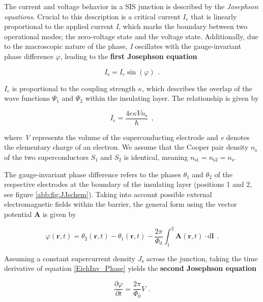 The current and voltage behavior in a SIS junction is described by the \textit{Josephson equations}. Crucial to this description is a critical current \textit{$I_\mathrm{c}$} that is linearly proportional to the applied current \textit{I}, which marks the boundary between two operational modes; the zero-voltage state and the voltage state. Additionally, due to the macroscopic nature of the phase, \textit{I} oscillates with the gauge-invariant phase difference $\varphi$, leading to the \textbf{first Josephson equation} \cite{Josephson1965}

\begin{equation}
\label{1.JE}
I_\mathrm{s} = I_\mathrm{c}\sin(\varphi) \ \ .
\end{equation}

$I_\mathrm{c}$ is proportional to the coupling strength $\kappa$, which describes the overlap of the wave functions $\Psi_1$ and $\Psi_2$ within the insulating layer. The relationship is given by

\begin{equation}
I_\mathrm{c} = \frac{4e\kappa V n_\mathrm{s}}{\hbar} \ \ ,
\end{equation}

where \textit{V} represents the volume of the superconducting electrode and \textit{e} denotes the elementary charge of an electron. We assume that the Cooper pair density $n_\mathrm{s}$ of the two superconductors $S_1$ and $S_2$ is identical, meaning $n_{\mathrm{s}1} = n_{\mathrm{s}2} = n_\mathrm{s}$.

The gauge-invariant phase difference refers to the phases $\theta_1$ and $\theta_2$ of the respective electrodes at the boundary of the insulating layer (positions 1 and 2, see figure \ref{abb:fig:JJschem}). Taking into account possible external electromagnetic fields within the barrier, the general form using the vector potential \textbf{A} is given by \cite{Gross2016}

\begin{equation}
\label{EichInv_Phase}
\varphi(\textbf{r},t) = \theta_2(\textbf{r},t) - \theta_1(\textbf{r},t) - \frac{2\pi}{\Phi_0}\int_{1}^{2}\textbf{A}(\textbf{r},t)\cdot \mathrm{d}\textbf{l} \ \ .
\end{equation}

Assuming a constant supercurrent density $J_\mathrm{s}$ across the junction, taking the time derivative of equation \eqref{EichInv_Phase} yields the \textbf{second Josephson equation} \cite{Josephson1965}

\begin{equation}
\label{2.JE}
\frac{\partial\varphi}{\partial t} = \frac{2\pi}{\Phi_0}V \ \ .
\end{equation}

